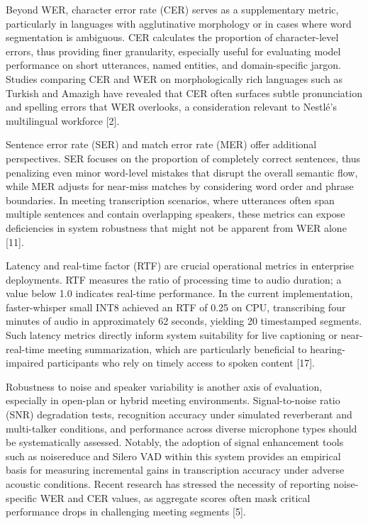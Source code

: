 \documentclass[12pt,a4paper]{article}
\begin{document}
Beyond WER, character error rate (CER) serves as a supplementary metric, particularly in languages with agglutinative morphology or in cases where word segmentation is ambiguous. CER calculates the proportion of character-level errors, thus providing finer granularity, especially useful for evaluating model performance on short utterances, named entities, and domain-specific jargon. Studies comparing CER and WER on morphologically rich languages such as Turkish and Amazigh have revealed that CER often surfaces subtle pronunciation and spelling errors that WER overlooks, a consideration relevant to Nestlé’s multilingual workforce [2].


Sentence error rate (SER) and match error rate (MER) offer additional perspectives. SER focuses on the proportion of completely correct sentences, thus penalizing even minor word-level mistakes that disrupt the overall semantic flow, while MER adjusts for near-miss matches by considering word order and phrase boundaries. In meeting transcription scenarios, where utterances often span multiple sentences and contain overlapping speakers, these metrics can expose deficiencies in system robustness that might not be apparent from WER alone [11].


Latency and real-time factor (RTF) are crucial operational metrics in enterprise deployments. RTF measures the ratio of processing time to audio duration; a value below 1.0 indicates real-time performance. In the current implementation, faster-whisper small INT8 achieved an RTF of 0.25 on CPU, transcribing four minutes of audio in approximately 62 seconds, yielding 20 timestamped segments. Such latency metrics directly inform system suitability for live captioning or near-real-time meeting summarization, which are particularly beneficial to hearing-impaired participants who rely on timely access to spoken content [17].


Robustness to noise and speaker variability is another axis of evaluation, especially in open-plan or hybrid meeting environments. Signal-to-noise ratio (SNR) degradation tests, recognition accuracy under simulated reverberant and multi-talker conditions, and performance across diverse microphone types should be systematically assessed. Notably, the adoption of signal enhancement tools such as noisereduce and Silero VAD within this system provides an empirical basis for measuring incremental gains in transcription accuracy under adverse acoustic conditions. Recent research has stressed the necessity of reporting noise-specific WER and CER values, as aggregate scores often mask critical performance drops in challenging meeting segments [5].
\end{document}
